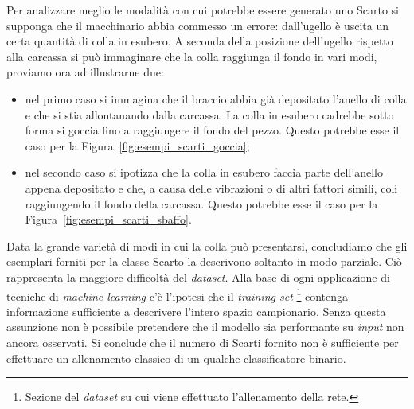 Per analizzare meglio le modalità con cui potrebbe essere generato uno Scarto si supponga che il macchinario abbia commesso un errore: dall'ugello è uscita un certa quantità di colla in esubero.
A seconda della posizione dell'ugello rispetto alla carcassa si può immaginare che la colla raggiunga il fondo in vari modi, proviamo ora ad illustrarne due:
\begin{itemize}
  \item nel primo caso si immagina che il braccio abbia già depositato l'anello di colla e che si stia allontanando dalla carcassa.
    La colla in esubero cadrebbe sotto forma si goccia fino a raggiungere il fondo del pezzo.
    Questo potrebbe esse il caso per la Figura~\ref{fig:esempi_scarti_goccia};
  \item nel secondo caso si ipotizza che la colla in esubero faccia parte dell'anello appena depositato e che, a causa delle vibrazioni o di altri fattori simili, coli raggiungendo il fondo della carcassa.
    Questo potrebbe esse il caso per la Figura~\ref{fig:esempi_scarti_sbaffo}.
\end{itemize}

Data la grande varietà di modi in cui la colla può presentarsi, concludiamo che gli esemplari forniti per la classe Scarto la descrivono soltanto in modo parziale.
Ciò rappresenta la maggiore difficoltà del \textit{dataset}.
Alla base di ogni applicazione di tecniche di \textit{machine learning} c'è l'ipotesi che il \textit{training set} \footnote{Sezione del \textit{dataset} su cui viene effettuato l'allenamento della rete.} contenga informazione sufficiente a descrivere l'intero spazio campionario.
Senza questa assunzione non è possibile pretendere che il modello sia performante su \textit{input} non ancora osservati.
Si conclude che il numero di Scarti fornito non è sufficiente per effettuare un allenamento classico di un qualche classificatore binario.


